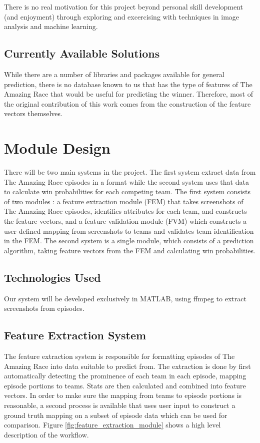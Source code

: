 \documentclass[10pt, twoside]{article}
\begin{document}
There is no real motivation for this project beyond personal skill development
(and enjoyment) through exploring and excercising with techniques in image
analysis and machine learning.

\subsection{Currently Available Solutions}
While there are a number of libraries and packages available for general prediction,
there is no database known to us that has the type of features of The Amazing
Race that would be useful for predicting the winner. Therefore, most of the
original contribution of this work comes from the construction of the feature vectors
themselves.

\section{Module Design}
There will be two main systems in the project. The first system extract data from
The Amazing Race episodes in a format while the second system uses that data
to calculate win probabilities for each competing team. The first system consists
of two modules : a feature extraction module (FEM) that takes screenshots of
The Amazing Race episodes, identifies attributes for each team, and constructs
the feature vectors, and a feature validation module (FVM) which constructs a
user-defined mapping from screenshots to teams and validates team identification
in the FEM. The second system is a single module, which consists of a prediction
algorithm, taking feature vectors from the FEM and calculating win probabilities.

\subsection{Technologies Used}
Our system will be developed exclusively in MATLAB, using ffmpeg to extract
screenshots from episodes.

\subsection{Feature Extraction System}
The feature extraction system is responsible for formatting episodes of The Amazing Race into
data suitable to predict from. The extraction is done by first automatically
detecting the prominence of each team in each episode, mapping episode portions
to teams. Stats are then calculated and combined into feature vectors. In order
to make sure the mapping from teams to episode portions is reasonable, a second
process is available that uses user input to construct a ground truth mapping on
a subset of episode data which can be used for comparison. Figure \ref{fig:feature_extraction_module}
shows a high level description of the workflow.
\end{document}
